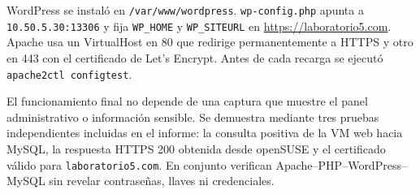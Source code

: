 WordPress se instaló en \texttt{/var/www/wordpress}. \texttt{wp-config.php} apunta a \texttt{10.50.5.30:13306} y fija \texttt{WP\_HOME} y \texttt{WP\_SITEURL} en \url{https://laboratorio5.com}. Apache usa un VirtualHost en 80 que redirige permanentemente a HTTPS y otro en 443 con el certificado de Let's Encrypt. Antes de cada recarga se ejecutó \texttt{apache2ctl configtest}.

El funcionamiento final no depende de una captura que muestre el panel administrativo o información sensible. Se demuestra mediante tres pruebas independientes incluidas en el informe: la consulta positiva de la VM web hacia MySQL, la respuesta HTTPS 200 obtenida desde openSUSE y el certificado válido para \texttt{laboratorio5.com}. En conjunto verifican Apache--PHP--WordPress--MySQL sin revelar contraseñas, llaves ni credenciales.

